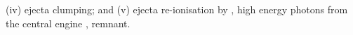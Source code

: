 (iv) ejecta clumping; 
and (v) ejecta re-ionisation by \eg, high energy photons from the central engine
\ie, \pmerg{} remnant.


